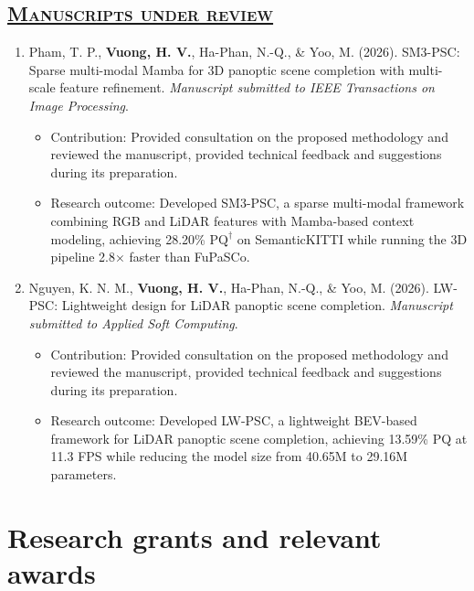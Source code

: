 \documentclass[a4paper,12pt]{article}
\begin{document}
\subsection*{\scshape\underline{Manuscripts under review}}
\begin{enumerate}[
    leftmargin=*,
    labelsep=0.5em,
    align=left
]

  \item
  Pham, T. P., \textbf{Vuong, H. V.}, Ha-Phan, N.-Q., \& Yoo, M. (2026).
  SM3-PSC: Sparse multi-modal Mamba for 3D panoptic scene completion with multi-scale feature refinement.
  \textit{Manuscript submitted to IEEE Transactions on Image Processing}.

\begin{itemize}[leftmargin=1.5em]
    \item Contribution: Provided consultation on the proposed methodology and reviewed the manuscript, provided technical feedback and suggestions during its preparation.
    \item Research outcome: Developed SM3-PSC, a sparse multi-modal
    framework combining RGB and LiDAR features with Mamba-based context modeling, achieving 28.20\% $\mathrm{PQ}^\dagger$ on SemanticKITTI while running the 3D pipeline 2.8$\times$ faster than FuPaSCo.
\end{itemize}

  \item
  Nguyen, K. N. M., \textbf{Vuong, H. V.}, Ha-Phan, N.-Q., \& Yoo, M. (2026).
  LW-PSC: Lightweight design for LiDAR panoptic scene completion.
  \textit{Manuscript submitted to Applied Soft Computing}.

\begin{itemize}[leftmargin=1.5em]
    \item Contribution: Provided consultation on the proposed methodology and reviewed the manuscript, provided technical feedback and suggestions during its preparation.
    \item Research outcome: Developed LW-PSC, a lightweight BEV-based
    framework for LiDAR panoptic scene completion, achieving 13.59\% PQ at 11.3 FPS while reducing the model size from 40.65M to 29.16M parameters.
\end{itemize}

\end{enumerate}
\vspace{-6mm}


\section{\textbf{Research grants and relevant awards}}
\vspace{0.5mm}
\end{document}
